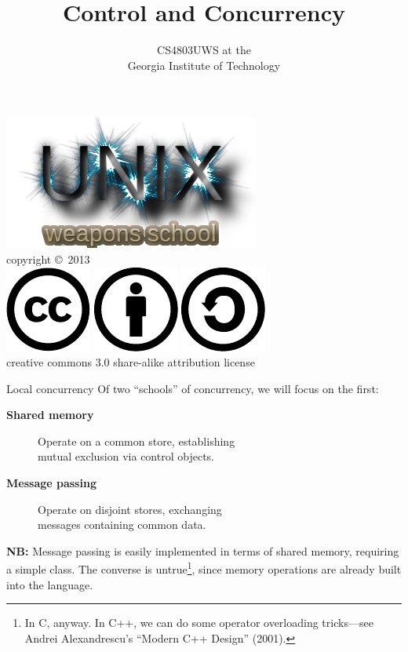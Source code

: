 \documentclass[mathserif,xcolor={dvipsnames,table}]{beamer}
\title{\textbf{Control and Concurrency}}
\date{}
\author{CS4803UWS at the\\
Georgia Institute of Technology
}
\begin{document}
\begin{frame}
\titlepage
\begin{center}
\includegraphics[scale=0.33]{images/uws.png}\\
\vspace{.1in}
\tiny{copyright \copyright\ 2013}\\
\includegraphics[scale=.25]{images/cc-logo.pdf}
\includegraphics[scale=.25]{images/cc-new.pdf}
\includegraphics[scale=.25]{images/cc-share.pdf}\\
\tiny{creative commons 3.0 share-alike attribution license}
\end{center}
\end{frame}

\begin{frame}{Local concurrency}
Of two ``schools'' of concurrency, we will focus on the first:
\vfill
\begin{description}
\item[\textbf{Shared memory}]\hfill{Operate on a common store, establishing\\ \hfill mutual exclusion via control objects.}
\item[\textbf{Message passing}]\hfill{Operate on disjoint stores, exchanging\\ \hfill messages containing common data.}
\end{description}
\vfill
\textbf{NB:} Message passing is easily implemented
in terms of shared memory, requiring a simple class. The converse is untrue\footnote{In C, anyway.
In C++, we can do some operator overloading tricks---see Andrei Alexandrescu's ``Modern C++ Design'' (2001).}, since
memory operations are already built into the language.
\end{frame}
\end{document}
